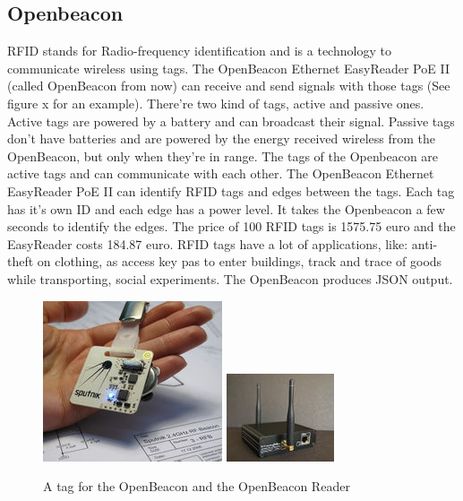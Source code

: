 	\subsection{Openbeacon}
			RFID stands for Radio-frequency identification and is a technology to communicate wireless using tags. The OpenBeacon Ethernet EasyReader PoE II (called OpenBeacon from now) can receive and send signals with those tags (See figure x for an example). There're two kind of tags, active and passive ones. Active tags are powered by a battery and can broadcast their signal. Passive tags don't have batteries and are powered by the energy received wireless from the OpenBeacon, but only when they're in range. The tags of the Openbeacon are active tags and can communicate with each other. The OpenBeacon Ethernet EasyReader PoE II can identify RFID tags and edges between the tags. Each tag has it's own ID and each edge has a power level. It takes the Openbeacon a few seconds to identify the edges. The price of 100 RFID tags is 1575.75 euro and the EasyReader costs 184.87 euro. RFID tags have a lot of applications, like: anti-theft on clothing, as access key pas to enter buildings, track and trace of goods while transporting, social experiments\cite{2008arXiv0811.4170B}. The OpenBeacon produces JSON output.


			\begin{figure}[h]
				\centering
					\includegraphics[scale=0.5]{tag.jpg}
					\includegraphics[scale=1.0]{reader.jpg}
					
					\caption{A tag for the OpenBeacon\cite{openbeacon} and the OpenBeacon Reader}

			\end{figure}


